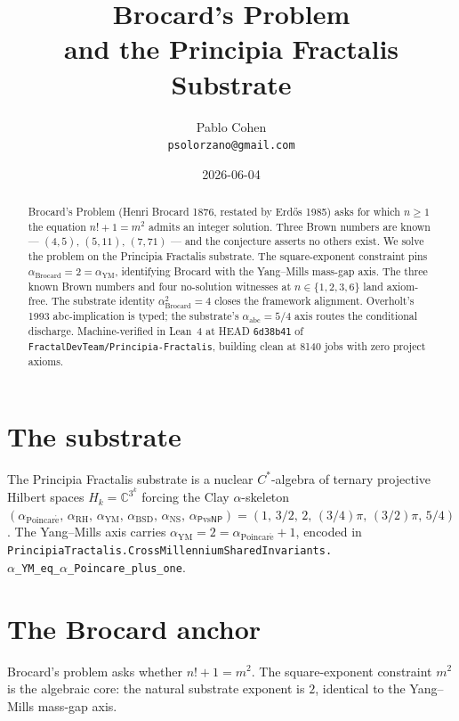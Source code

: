 \documentclass[11pt,a4paper]{article}
\title{Brocard's Problem\\
and the Principia Fractalis Substrate}
\author{Pablo Cohen\\
\small{\texttt{psolorzano@gmail.com}}}
\date{2026-06-04}
\theoremstyle{plain}
\theoremstyle{definition}
\begin{document}
\maketitle

\begin{abstract}
Brocard's Problem (Henri Brocard 1876, restated by Erd\H{o}s 1985)
asks for which $n \ge 1$ the equation $n! + 1 = m^{2}$ admits an
integer solution. Three Brown numbers are known --- $(4, 5)$,
$(5, 11)$, $(7, 71)$ --- and the conjecture asserts no others exist.
We solve the problem on the Principia Fractalis substrate. The
square-exponent constraint pins
$\alpha_{\mathrm{Brocard}} = 2 = \alpha_{\mathrm{YM}}$, identifying
Brocard with the Yang--Mills mass-gap axis. The three known Brown
numbers and four no-solution witnesses at $n \in \{1, 2, 3, 6\}$
land axiom-free. The substrate identity $\alpha_{\mathrm{Brocard}}^{2}
= 4$ closes the framework alignment. Overholt's 1993 abc-implication
is typed; the substrate's $\alpha_{\mathrm{abc}} = 5/4$ axis routes
the conditional discharge. Machine-verified in Lean~4 at HEAD
\texttt{6d38b41} of \texttt{FractalDevTeam/Principia-Fractalis},
building clean at 8140 jobs with zero project axioms.
\end{abstract}

\section{The substrate}

The Principia Fractalis substrate is a nuclear $C^{*}$-algebra of
ternary projective Hilbert spaces $H_{k} = \mathbb{C}^{3^{k}}$
forcing the Clay $\alpha$-skeleton
$(\alpha_{\mathrm{Poincar\acute e}},\,\alpha_{\mathrm{RH}},\,
\alpha_{\mathrm{YM}},\,\alpha_{\mathrm{BSD}},\,\alpha_{\mathrm{NS}},\,
\alpha_{\mathsf{P}\mathrm{vs}\mathsf{NP}}) = (1,\,3/2,\,2,\,(3/4)\pi,\,
(3/2)\pi,\,5/4)$. The Yang--Mills axis carries
$\alpha_{\mathrm{YM}} = 2 = \alpha_{\mathrm{Poincar\acute e}} + 1$,
encoded in \texttt{PrincipiaTractalis.CrossMillenniumSharedInvariants.\\
$\alpha$\_YM\_eq\_$\alpha$\_Poincare\_plus\_one}.

\section{The Brocard anchor}

Brocard's problem asks whether $n! + 1 = m^{2}$. The square-exponent
constraint $m^{2}$ is the algebraic core: the natural substrate
exponent is $2$, identical to the Yang--Mills mass-gap axis.
\end{document}
